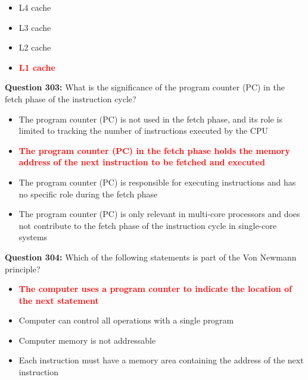 \documentclass[12pt,a4paper]{article}
\begin{document}
\begin{itemize}
    \item[\textbf{A.}] L4 cache
    \item[\textbf{B.}] L3 cache
    \item[\textbf{C.}] L2 cache
    \item[\textbf{D.}] \textcolor{red}{\textbf{L1 cache}}
\end{itemize}

\vspace{0.5cm}

\textbf{Question 303:} What is the significance of the program counter (PC) in the fetch phase of the instruction cycle?

\begin{itemize}
    \item[\textbf{A.}] The program counter (PC) is not used in the fetch phase, and its role is limited to tracking the number of instructions executed by the CPU
    \item[\textbf{B.}] \textcolor{red}{\textbf{The program counter (PC) in the fetch phase holds the memory address of the next instruction to be fetched and executed}}
    \item[\textbf{C.}] The program counter (PC) is responsible for executing instructions and has no specific role during the fetch phase
    \item[\textbf{D.}] The program counter (PC) is only relevant in multi-core processors and does not contribute to the fetch phase of the instruction cycle in single-core systems
\end{itemize}

\vspace{0.5cm}

\textbf{Question 304:} Which of the following statements is part of the Von Newmann principle?

\begin{itemize}
    \item[\textbf{A.}] \textcolor{red}{\textbf{The computer uses a program counter to indicate the location of the next statement}}
    \item[\textbf{B.}] Computer can control all operations with a single program
    \item[\textbf{C.}] Computer memory is not addressable
    \item[\textbf{D.}] Each instruction must have a memory area containing the address of the next instruction
\end{itemize}
\end{document}
